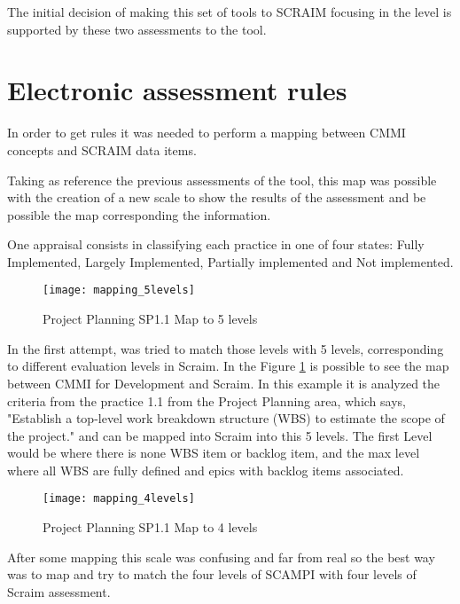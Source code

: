 The initial decision of making this set of tools to SCRAIM focusing in the level is supported by these two assessments to the tool.



\section{Electronic assessment rules} \label{sec:mapping}

In order to get rules it was needed to perform a mapping between CMMI concepts and SCRAIM data items. 

Taking as reference the previous assessments of the tool, this map was possible with the creation of a new scale to show the results of the assessment and be possible the map corresponding the information.

One appraisal consists in classifying each practice in one of four states: Fully Implemented, Largely Implemented, Partially implemented and Not implemented.

\begin{figure}[h]
	\begin{center}
		\leavevmode
		\texttt{[image: mapping\_5levels]}
		\caption{Project Planning SP1.1 Map to 5 levels}
		\label{fig:mapping_5levels}
	\end{center}
\end{figure}

In the first attempt, was tried to match those levels with 5 levels, corresponding to different evaluation levels in Scraim. In the Figure \ref{fig:mapping_5levels} is possible to see the map between CMMI for Development and Scraim. In this example it is analyzed the criteria from the practice 1.1 from the Project Planning area, which says, "Establish a top-level work breakdown structure (WBS) to estimate the scope of the project." and can be mapped into Scraim into this 5 levels. The first Level would be where there is none WBS item or backlog item, and the max level where all WBS are fully defined and epics with backlog items associated. 

\begin{figure}[h]
	\begin{center}
		\leavevmode
		\texttt{[image: mapping\_4levels]}
		\caption{Project Planning SP1.1 Map to 4 levels}
		\label{fig:mapping_4levels}
	\end{center}
\end{figure}

After some mapping this scale was confusing and far from real so the best way was to map and try to match the four levels of SCAMPI with four levels of Scraim assessment.

